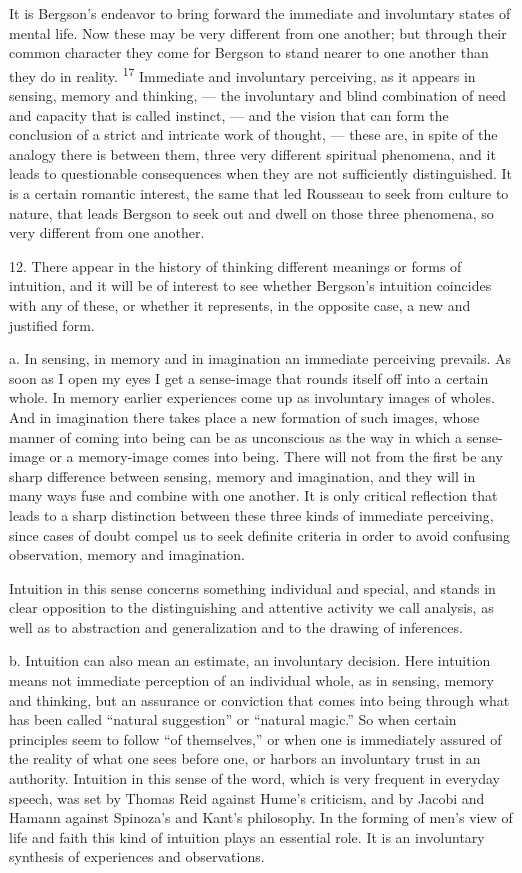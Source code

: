 \documentclass[12pt,a4paper,openany]{book}
\newcommand{\opage}[1]{\marginnote{\footnotesize\textit{[#1]}}}
\newcommand{\nm}[1]{\unskip\textsuperscript{#1}}
\begin{document}
It is Bergson's endeavor to bring forward the immediate and involuntary states of mental life. Now these may be very different from one another; but through their common character they come for Bergson to stand nearer to one another than they do in reality. \nm{17} Immediate and involuntary perceiving, as it appears in sensing, memory and thinking, --- the involuntary and blind combination of need and capacity that is called instinct, --- and the vision that can form the conclusion of a strict and intricate work of thought, --- these are, in spite of the analogy there is between them, three very different spiritual phenomena, and it leads to questionable consequences when they are not sufficiently distinguished. It is a certain romantic interest, the same that led Rousseau to seek from culture to nature, that leads Bergson to seek out and dwell on those three phenomena, so very different from one another.

12. There appear in the history of thinking different meanings or forms of intuition, and it will be of interest to see whether Bergson's intuition coincides with any of these, or whether it represents, in the opposite case, a new and justified form.

a. In sensing, in memory and in imagination an immediate perceiving prevails. As soon as I open my eyes I get a sense-image that rounds itself off into a certain whole. In memory earlier experiences come up as involuntary images of wholes. And in imagination there takes place a new formation of such images, whose manner of coming into being can be as unconscious as the way in which a sense-image or a memory-image comes into being. There will not from the first be any sharp difference between sensing, memory and imagination, and they will in many
\opage{23}ways fuse and combine with one another. It is only critical reflection that leads to a sharp distinction between these three kinds of immediate perceiving, since cases of doubt compel us to seek definite criteria in order to avoid confusing observation, memory and imagination.

Intuition in this sense concerns something individual and special, and stands in clear opposition to the distinguishing and attentive activity we call analysis, as well as to abstraction and generalization and to the drawing of inferences.

b. Intuition can also mean an estimate, an involuntary decision. Here intuition means not immediate perception of an individual whole, as in sensing, memory and thinking, but an assurance or conviction that comes into being through what has been called ``natural suggestion'' or ``natural magic.'' So when certain principles seem to follow ``of themselves,'' or when one is immediately assured of the reality of what one sees before one, or harbors an involuntary trust in an authority. Intuition in this sense of the word, which is very frequent in everyday speech, was set by Thomas Reid against Hume's criticism, and by Jacobi and Hamann against Spinoza's and Kant's philosophy. In the forming of men's view of life and faith this kind of intuition plays an essential role. It is an involuntary synthesis of experiences and observations.
\end{document}
